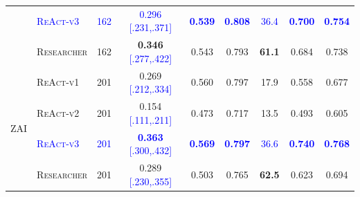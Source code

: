 \begin{table}[h]
{\begin{tabular}{llccccccc}
  & \textcolor{blue}{\textsc{ReAct-v3}}   & \textcolor{blue}{162} & \textcolor{blue}{0.296 [.231,.371]} & \textcolor{blue}{\textbf{0.539}} & \textcolor{blue}{\textbf{0.808}} & \textcolor{blue}{36.4} & \textcolor{blue}{\textbf{0.700}}     & \textcolor{blue}{\textbf{0.754}}     \\
  & \textsc{Researcher}  & 162 & \textbf{0.346} \textcolor{blue}{[.277,.422]}     & 0.543 & 0.793          & \textbf{61.1} & 0.684              & 0.738              \\
\midrule
\multirow{4}{*}{ZAI}
  & \textsc{ReAct-v1}   & 201 & 0.269 \textcolor{blue}{[.212,.334]} & 0.560 & 0.797          & 17.9 & 0.558              & 0.677     \\
  & \textsc{ReAct-v2}   & 201 & 0.154 \textcolor{blue}{[.111,.211]} & 0.473          & 0.717          & 13.5 & 0.493              & 0.605              \\
  & \textcolor{blue}{\textsc{ReAct-v3}}   & \textcolor{blue}{201} & \textcolor{blue}{\textbf{0.363} [.300,.432]} & \textcolor{blue}{\textbf{0.569}}          & \textcolor{blue}{\textbf{0.797}}          & \textcolor{blue}{36.6} & \textcolor{blue}{\textbf{0.740}}     & \textcolor{blue}{\textbf{0.768}}     \\
  & \textsc{Researcher}  & 201 & 0.289 \textcolor{blue}{[.230,.355]}     & 0.503          & 0.765          & \textbf{62.5} & 0.623     & 0.694              \\
\bottomrule
\end{tabular}
}
\end{table}

